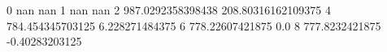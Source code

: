 0 nan nan
1 nan nan
2 987.0292358398438 208.80316162109375
4 784.454345703125 6.228271484375
6 778.22607421875 0.0
8 777.8232421875 -0.40283203125
